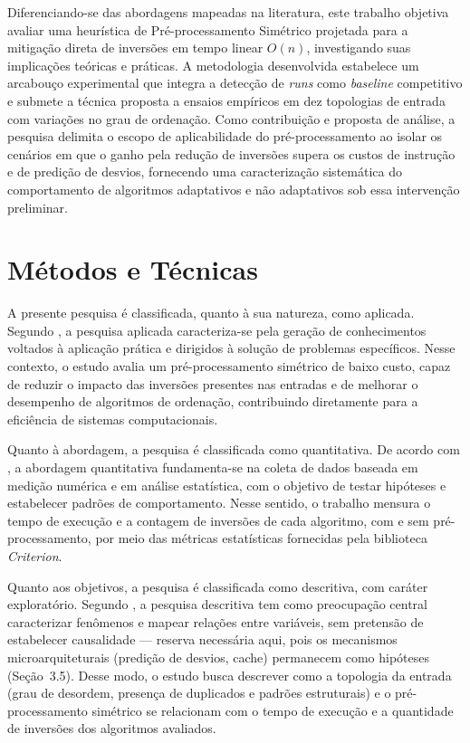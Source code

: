 \documentclass[portuguese]{sbc2025}%
\begin{document}
Diferenciando-se das abordagens mapeadas na literatura, este trabalho objetiva avaliar uma heurística de Pré-processamento Simétrico projetada para a mitigação direta de inversões em tempo linear $O(n)$, investigando suas implicações teóricas e práticas. A metodologia desenvolvida estabelece um arcabouço experimental que integra a detecção de \emph{runs} como \emph{baseline} competitivo e submete a técnica proposta a ensaios empíricos em dez topologias de entrada com variações no grau de ordenação. Como contribuição e proposta de análise, a pesquisa delimita o escopo de aplicabilidade do pré-processamento ao isolar os cenários em que o ganho pela redução de inversões supera os custos de instrução e de predição de desvios, fornecendo uma caracterização sistemática do comportamento de algoritmos adaptativos e não adaptativos sob essa intervenção preliminar.

\section{Métodos e Técnicas}\label{sec:met}

A presente pesquisa é classificada, quanto à sua natureza, como aplicada. Segundo \citep{gil_metodos_2019}, a pesquisa aplicada caracteriza-se pela geração de conhecimentos voltados à aplicação prática e dirigidos à solução de problemas específicos. Nesse contexto, o estudo avalia um pré-processamento simétrico de baixo custo, capaz de reduzir o impacto das inversões presentes nas entradas e de melhorar o desempenho de algoritmos de ordenação, contribuindo diretamente para a eficiência de sistemas computacionais.

Quanto à abordagem, a pesquisa é classificada como quantitativa. De acordo com \citep{sampieri_metodologia_2021}, a abordagem quantitativa fundamenta-se na coleta de dados baseada em medição numérica e em análise estatística, com o objetivo de testar hipóteses e estabelecer padrões de comportamento. Nesse sentido, o trabalho mensura o tempo de execução e a contagem de inversões de cada algoritmo, com e sem pré-processamento, por meio das métricas estatísticas fornecidas pela biblioteca \emph{Criterion}.

Quanto aos objetivos, a pesquisa é classificada como descritiva, com caráter exploratório. Segundo \citep{gil_metodos_2019}, a pesquisa descritiva tem como preocupação central caracterizar fenômenos e mapear relações entre variáveis, sem pretensão de estabelecer causalidade — reserva necessária aqui, pois os mecanismos microarquiteturais (predição de desvios, cache) permanecem como hipóteses (Seção~3.5). Desse modo, o estudo busca descrever como a topologia da entrada (grau de desordem, presença de duplicados e padrões estruturais) e o pré-processamento simétrico se relacionam com o tempo de execução e a quantidade de inversões dos algoritmos avaliados.
\end{document}
